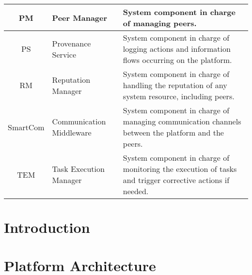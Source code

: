 \documentclass{SmartReport}
\begin{document}
\begin{tabular}{|c|p{3cm}|p{10cm}|}
\hline 
PM & Peer Manager &  System component in charge of managing peers.\\
\hline 
PS & Provenance Service & System component in charge of logging actions and information flows occurring on the platform.\\
\hline
RM & Reputation Manager & System component in charge of handling the reputation of any system resource, including peers. \\
\hline
SmartCom & Communication Middleware & System component in charge of managing
communication channels between the platform and the peers. \\
\hline
TEM & Task Execution Manager & System component in charge of
monitoring the execution of tasks and trigger corrective actions if
needed.\\
\hline
\end{tabular}

\newpage


\section{Introduction}
\label{sec:intro}


\newpage


\section{Platform Architecture}
\label{sec:arch}

\newpage

% 

% 
\end{document}
